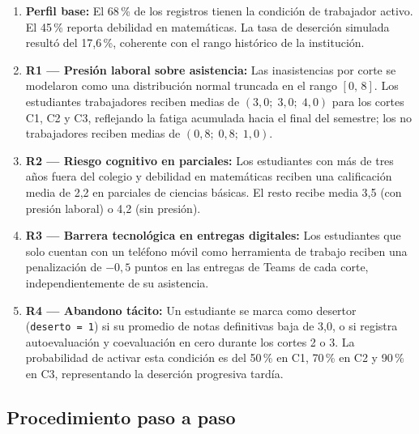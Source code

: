 \documentclass[12pt,letterpaper]{article}
\begin{document}
\begin{enumerate}
  \item \textbf{Perfil base:} El 68\,\% de los registros tienen la condición de trabajador activo. El 45\,\% reporta debilidad en matemáticas. La tasa de deserción simulada resultó del 17,6\,\%, coherente con el rango histórico de la institución.

  \item \textbf{R1 — Presión laboral sobre asistencia:} Las inasistencias por corte se modelaron como una distribución normal truncada en el rango $[0,\, 8]$. Los estudiantes trabajadores reciben medias de $(3{,}0;\; 3{,}0;\; 4{,}0)$ para los cortes C1, C2 y C3, reflejando la fatiga acumulada hacia el final del semestre; los no trabajadores reciben medias de $(0{,}8;\; 0{,}8;\; 1{,}0)$.

  \item \textbf{R2 — Riesgo cognitivo en parciales:} Los estudiantes con más de tres años fuera del colegio y debilidad en matemáticas reciben una calificación media de 2,2 en parciales de ciencias básicas. El resto recibe media 3,5 (con presión laboral) o 4,2 (sin presión).

  \item \textbf{R3 — Barrera tecnológica en entregas digitales:} Los estudiantes que solo cuentan con un teléfono móvil como herramienta de trabajo reciben una penalización de $-0{,}5$ puntos en las entregas de Teams de cada corte, independientemente de su asistencia.

  \item \textbf{R4 — Abandono tácito:} Un estudiante se marca como desertor (\texttt{deserto~=~1}) si su promedio de notas definitivas baja de 3,0, o si registra autoevaluación y coevaluación en cero durante los cortes 2 o 3. La probabilidad de activar esta condición es del 50\,\% en C1, 70\,\% en C2 y 90\,\% en C3, representando la deserción progresiva tardía.
\end{enumerate}

\subsection{Procedimiento paso a paso}
\end{document}
